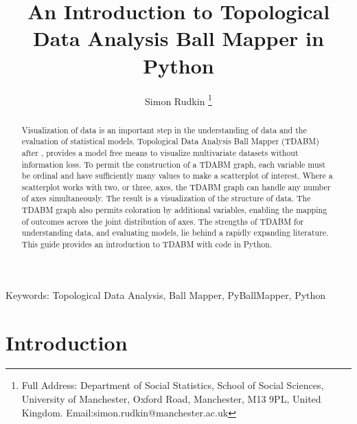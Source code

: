\documentclass{article}
\begin{document}
	
	\vspace{-40pt}
	\title{An Introduction to Topological Data Analysis Ball Mapper in Python}
	\vspace{-30pt}

	\author[1]{Simon Rudkin \thanks{Full Address: Department of Social Statistics, School of Social Sciences, University of Manchester, Oxford Road, Manchester, M13 9PL, United Kingdom. Email:simon.rudkin@manchester.ac.uk}}
	
	\vspace{-40pt}
	\vspace{-20pt}
	\date{}
	\doublespacing
	
	\maketitle
	\vspace{-30pt}
	\begin{abstract}		
		Visualization of data is an important step in the understanding of data and the evaluation of statistical models. Topological Data Analysis Ball Mapper (TDABM) after \cite{dlotko2019ball}, provides a model free means to visualize multivariate datasets without information loss. To permit the construction of a TDABM graph, each variable must be ordinal and have sufficiently many values to make a scatterplot of interest. Where a scatterplot works with two, or three, axes, the TDABM graph can handle any number of axes simultaneously. The result is a visualization of the structure of data. The TDABM graph also permits coloration by additional variables, enabling the mapping of outcomes across the joint distribution of axes. The strengths of TDABM for understanding data, and evaluating models, lie behind a rapidly expanding literature. This guide provides an introduction to TDABM with code in Python. 
	\end{abstract}

Keywords: Topological Data Analysis, Ball Mapper, PyBallMapper, Python

\section{Introduction}
\end{document}
